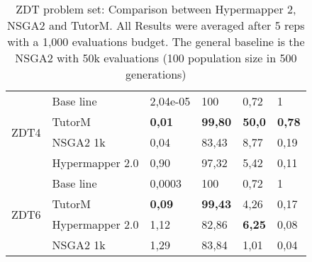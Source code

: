\begin{table}[]
{\begin{tabular}{@{}llllll@{}}
    \multirow{4}{*}{ZDT4} & Base line       & 2,04e-05          & 100            & 0,72           & 1             \\ \cmidrule(l){2-6} 
                          & TutorM          & \textbf{0,01}     & \textbf{99,80} & \textbf{50,0}  & \textbf{0,78} \\ \cmidrule(l){2-6} 
                          & NSGA2 1k        & 0,04              & 83,43          & 8,77           & 0,19          \\ \cmidrule(l){2-6} 
                          & Hypermapper 2.0 & 0,90              & 97,32          & 5,42           & 0,11          \\ \midrule
    \multirow{4}{*}{ZDT6} & Base line       & 0,0003            & 100            & 0,72           & 1             \\ \cmidrule(l){2-6} 
                          & TutorM          & \textbf{0,09}     & \textbf{99,43} & 4,26           & 0,17          \\ \cmidrule(l){2-6} 
                          & Hypermapper 2.0 & 1,12              & 82,86          & \textbf{6,25}  & 0,08          \\ \cmidrule(l){2-6} 
                          & NSGA2 1k        & 1,29              & 83,84          & 1,01           & 0,04          \\ \bottomrule
    \end{tabular}%
    }
    \caption{ZDT problem set: Comparison between Hypermapper 2, NSGA2 and TutorM.  All Results were averaged after 5 reps with a 1,000 evaluations budget.
    The general baseline is the NSGA2 with 50k evaluations (100 population size in 500 generations)}
    \label{tab:zdt_summary}
    \end{table}